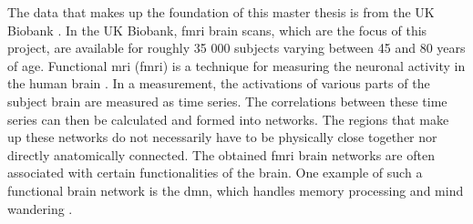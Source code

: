The data that makes up the foundation of this master thesis is from the UK Biobank \cite{ukbiobank}. In the UK Biobank, \acrshort{fmri} brain scans, which are the focus of this project, are available for roughly 35 000 subjects varying between 45 and 80 years of age. Functional \acrshort{mri} (\acrshort{fmri}) is a technique for measuring the neuronal activity in the human brain \cite{sporns}. In a measurement, the activations of various parts of the subject brain are measured as time series. The correlations between these time series can then be calculated and formed into networks. The regions that make up these networks do not necessarily have to be physically close together nor directly anatomically connected. The obtained \acrshort{fmri} brain networks are often associated with certain functionalities of the brain. One example of such a functional brain network is the \acrfull{dmn}, which handles memory processing and mind wandering  \cite{alves_dmn}. 


